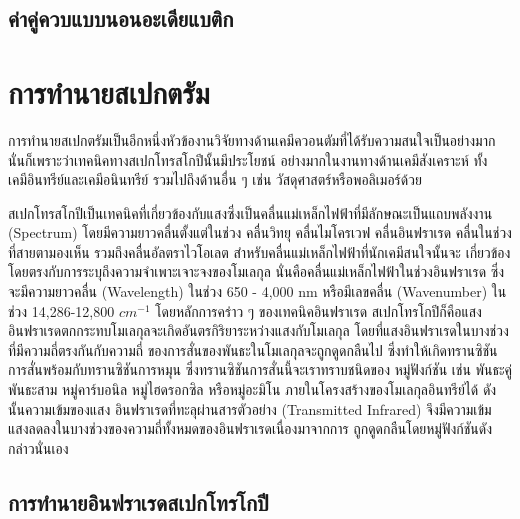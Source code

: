 \subsection{ค่าคู่ควบแบบนอนอะเดียแบติก}
\label{ssec:nonadia_coupling}



\section{การทำนายสเปกตรัม}
\label{sec:pred_spectra}

การทำนายสเปกตรัมเป็นอีกหนึ่งหัวข้องานวิจัยทางด้านเคมีควอนตัมที่ได้รับความสนใจเป็นอย่างมากนั่นก็เพราะว่าเทคนิคทางสเปกโทรสโกปีนั้นมีประโยชน์%
อย่างมากในงานทางด้านเคมีสังเคราะห์ ทั้งเคมีอินทรีย์และเคมีอนินทรีย์ รวมไปถึงด้านอื่น ๆ เช่น วัสดุศาสตร์หรือพอลิเมอร์ด้วย 

สเปกโทรสโกปีเป็นเทคนิคที่เกี่ยวข้องกับแสงซึ่งเป็นคลื่นแม่เหล็กไฟฟ้าที่มีลักษณะเป็นแถบพลังงาน (Spectrum) โดยมีความยาวคลื่นตั้งแต่ในช่วง 
คลื่นวิทยุ คลื่นไมโครเวฟ คลื่นอินฟราเรด คลื่นในช่วงที่สายตามองเห็น รวมถึงคลื่นอัลตราไวโอเลต สำหรับคลื่นแม่เหล็กไฟฟ้าที่นักเคมีสนใจนั้นจะ%
เกี่ยวข้องโดยตรงกับการระบุถึงความจำเพาะเจาะจงของโมเลกุล นั่นคือคลื่นแม่เหล็กไฟฟ้าในช่วงอินฟราเรด ซึ่งจะมีความยาวคลื่น (Wavelength) 
ในช่วง 650 - 4,000 nm หรือมีเลขคลื่น (Wavenumber) ในช่วง 14,286-12,800 $cm^{-1}$ โดยหลักการคร่าว ๆ ของเทคนิคอินฟราเรด%
สเปกโทรโกปีก็คือแสงอินฟราเรดตกกระทบโมเลกุลจะเกิดอันตรกิริยาระหว่างแสงกับโมเลกุล โดยที่แสงอินฟราเรดในบางช่วงที่มีความถี่ตรงกันกับความถี่%
ของการสั่นของพันธะในโมเลกุลจะถูกดูดกลืนไป ซึ่งทำให้เกิดทรานซิชันการสั่นพร้อมกับทรานซิชันการหมุน ซึ่งทรานซิชันการสั่นนี้จะเราทราบชนิดของ%
หมู่ฟังก์ชัน เช่น พันธะคู่ พันธะสาม หมู่คาร์บอนิล หมู่ไฮดรอกซิล หรือหมู่อะมิโน ภายในโครงสร้างของโมเลกุลอินทรีย์ได้ ดังนั้นความเข้มของแสง%
อินฟราเรดที่ทะลุผ่านสารตัวอย่าง (Transmitted Infrared) จึงมีความเข้มแสงลดลงในบางช่วงของความถี่ทั้งหมดของอินฟราเรดเนื่องมาจากการ%
ถูกดูดกลืนโดยหมู่ฟังก์ชันดังกล่าวนั่นเอง

\subsection{การทำนายอินฟราเรดสเปกโทรโกปี}
\label{ssec:pred_spec_ir}

